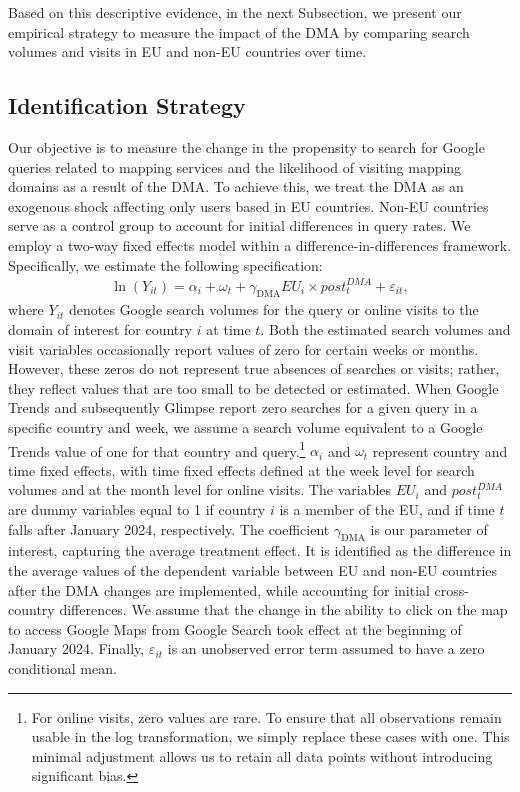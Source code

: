 \documentclass[11pt]{article}
\begin{document}
	Based on this descriptive evidence, in the next Subsection, we present our empirical strategy to measure the impact of the DMA by comparing search volumes and visits in EU and non-EU countries over time.
	
	\subsection{Identification Strategy} \label{subsec:ident}
	
	Our objective is to measure the change in the propensity to search for Google queries related to mapping services and the likelihood of visiting mapping domains as a result of the DMA. To achieve this, we treat the DMA as an exogenous shock affecting only users based in EU countries. Non-EU countries serve as a control group to account for initial differences in query rates. We employ a two-way fixed effects model within a difference-in-differences framework. Specifically, we estimate the following specification:
	\begin{align} \label{eq:did}
		\ln \left( Y_{it} \right)
		= \alpha_i + \omega_t + \gamma_{\mathrm{DMA}} EU_i\times post_t^{DMA} + \varepsilon_{it},
	\end{align}
	where $Y_{it}$ denotes Google search volumes for the query or online visits to the domain of interest for country $i$ at time $t$. Both the estimated search volumes and visit variables occasionally report values of zero for certain weeks or months. However, these zeros do not represent true absences of searches or visits; rather, they reflect values that are too small to be detected or estimated. When Google Trends and subsequently Glimpse report zero searches for a given query in a specific country and week, we assume a search volume equivalent to a Google Trends value of one for that country and query.\footnote{For online visits, zero values are rare. To ensure that all observations remain usable in the log transformation, we simply replace these cases with one. This minimal adjustment allows us to retain all data points without introducing significant bias.} $\alpha_i$ and $\omega_t$ represent country and time fixed effects, with time fixed effects defined at the week level for search volumes and at the month level for online visits. The variables $EU_i$ and $post_t^{DMA}$ are dummy variables equal to 1 if country $i$ is a member of the EU, and if time $t$ falls after January 2024, respectively. The coefficient $\gamma_{\mathrm{DMA}}$ is our parameter of interest, capturing the average treatment effect. It is identified as the difference in the average values of the dependent variable between EU and non-EU countries after the DMA changes are implemented, while accounting for initial cross-country differences. We assume that the change in the ability to click on the map to access Google Maps from Google Search took effect at the beginning of January 2024. Finally, $\varepsilon_{it}$ is an unobserved error term assumed to have a zero conditional mean.
	
\end{document}
